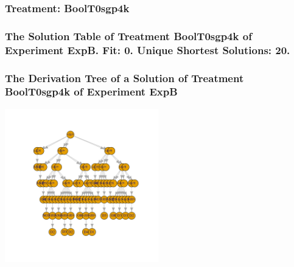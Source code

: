\documentclass[18pt,c]{beamer}
\begin{document}
 \begin{frame}
 \fontsize{8pt}{9pt}\selectfont
 \frametitle{ Treatment: BoolT0sgp4k }

 \label{ExpBStatsTable009.tex}  
 \end{frame}

 \begin{frame}
 \fontsize{8pt}{9pt}\selectfont
 \frametitle{ The Solution Table of Treatment BoolT0sgp4k of Experiment ExpB. Fit: 0. Unique Shortest Solutions: 20. }

 \label{ExpBSolutionTable002.tex}  
 \end{frame}

 \begin{frame}
 \frametitle{ The Derivation Tree of a Solution of Treatment BoolT0sgp4k of Experiment ExpB }
 \begin{center}
\includegraphics[width=0.5\textwidth, angle=0]
{ExpBDerivationTreeFigure002.pdf}
 \end{center}
 \label{report/ExpBDerivationTreeFigure002.pdf}  
 \end{frame}
\end{document}
